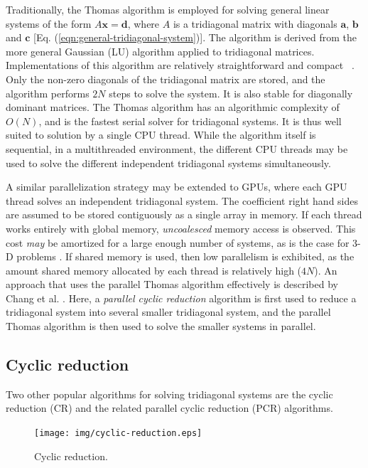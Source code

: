 Traditionally,
the Thomas algorithm is employed for solving
general linear systems of the form $A\bm{x} = \bm{d}$,
where $A$ is a tridiagonal matrix with diagonals
$\bm{a}$, $\bm{b}$ and $\bm{c}$
[Eq. (\ref{eqn:general-tridiagonal-system})].
The algorithm is derived
from the more general Gaussian (LU) algorithm
applied to tridiagonal matrices.
Implementations of this algorithm are relatively straightforward
and compact ~\cite{numericalrecipes}.
Only the non-zero diagonals of the tridiagonal matrix
are stored,
and the algorithm performs $2N$ steps
to solve the system.
It is also stable for diagonally dominant matrices.
The Thomas algorithm has an algorithmic complexity of $O(N)$,
and is the fastest serial solver for tridiagonal systems.
It is thus well suited to solution by a single CPU thread.
While the algorithm itself is sequential,
in a multithreaded environment,
the different CPU threads may be used to solve
the different independent tridiagonal systems simultaneously.

A similar parallelization strategy may be extended to GPUs,
where each GPU thread solves an independent tridiagonal system.
The coefficient right hand sides are assumed to be stored
contiguously as a single array in memory.
If each thread works entirely with global memory,
\emph{uncoalesced} memory access is observed.
This cost \emph{may} be amortized for a large enough
number of systems, as is the case
for 3-D problems \cite{sakharnykhADIconf}.
If shared memory is used,
then low parallelism is exhibited,
as the amount shared memory allocated by each thread
is relatively high ($4N$).
An approach that uses the parallel Thomas algorithm
effectively is described by Chang et al. \cite{chang2012scalable}.
Here, a \emph{parallel cyclic reduction} algorithm
is first used to reduce a
tridiagonal system into several smaller tridiagonal system,
and the parallel Thomas algorithm is then used to
solve the smaller systems in parallel.

\subsection{Cyclic reduction}

Two other popular algorithms for solving
tridiagonal systems are the
cyclic reduction (CR) and
the related parallel cyclic reduction (PCR)
algorithms.

\begin{figure}
\begin{center}
\texttt{[image: img/cyclic-reduction.eps]}
\end{center}
\caption{Cyclic reduction.}
\label{fig:cyclic-reduction}
\end{figure}

